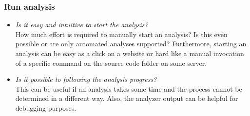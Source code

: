 \documentclass[conference]{IEEEtran}
\begin{document}
\subsubsection{Run analysis}
\label{subsubsec:evaluation_run}
\begin{itemize}
	\item \textit{Is it easy and intuitive to start the analysis?} \\
	How much effort is required to manually start an analysis? Is this even possible or are only automated analyses supported? Furthermore, starting an analysis can be easy as a click on a website or hard like a manual invocation of a specific command on the source code folder on some server.
	
	\item \textit{Is it possible to following the analysis progress?} \\
	This can be useful if an analysis takes some time and the process cannot be determined in a different way. Also, the analyzer output can be helpful for debugging purposes.
\end{itemize}
\end{document}
